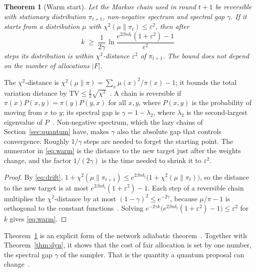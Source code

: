 \documentclass[11pt,a4paper]{article}
\newtheorem{theorem}{Theorem}
\newcommand{\TV}{\mathrm{TV}}
\begin{document}
\begin{theorem}[Warm start]\label{thm:warm}
Let the Markov chain used in round $t+1$ be reversible with stationary distribution $\pi_{t+1}$,
non-negative spectrum and spectral gap $\gamma$. If it starts from a distribution $\mu$ with $\chi^2(\mu\|\pi_t)\le\varepsilon^2$,
then after
\begin{equation}\label{eq:warm}
k\;\ge\;\frac1{2\gamma}\,\ln\frac{e^{2\beta n\delta_t}(1+\varepsilon^2)-1}{\varepsilon^2}
\end{equation}
steps its distribution is within $\chi^2$-distance $\varepsilon^2$ of $\pi_{t+1}$. The bound does not
depend on the number of allocations $|F|$.
\end{theorem}

The $\chi^2$-distance is $\chi^2(\mu\|\pi)=\sum_x\mu(x)^2/\pi(x)-1$; it bounds the total variation
distance by $\TV\le\frac12\sqrt{\chi^2}$~\cite{levin2017markov}. A chain is reversible if
$\pi(x)P(x,y)=\pi(y)P(y,x)$ for all $x,y$, where $P(x,y)$ is the probability of moving from $x$ to $y$;
its spectral gap is $\gamma=1-\lambda_2$, where $\lambda_2$ is the second-largest eigenvalue of
$P$~\cite{levin2017markov}. Non-negative spectrum, which the lazy chains of Section~\ref{sec:quantum}
have, makes $\gamma$ also the absolute gap that controls convergence. Roughly $1/\gamma$ steps are needed to forget the starting point. The
numerator in \eqref{eq:warm} is the distance to the new target just after the weights change, and
the factor $1/(2\gamma)$ is the time needed to shrink it to $\varepsilon^2$.

\begin{proof}
By \eqref{eq:drift}, $1+\chi^2(\mu\|\pi_{t+1})\le e^{2\beta n\delta_t}\bigl(1+\chi^2(\mu\|\pi_t)\bigr)$,
so the distance to the new target is at most $e^{2\beta n\delta_t}(1+\varepsilon^2)-1$. Each step of a
reversible chain multiplies the $\chi^2$-distance by at most $(1-\gamma)^2\le e^{-2\gamma}$, because
$\mu/\pi-1$ is orthogonal to the constant functions~\cite{levin2017markov}. Solving
$e^{-2\gamma k}\bigl(e^{2\beta n\delta_t}(1+\varepsilon^2)-1\bigr)\le\varepsilon^2$ for $k$ gives
\eqref{eq:warm}.
\end{proof}

Theorem~\ref{thm:warm} is an explicit form of the network adiabatic
theorem~\cite{rajagopalan2009network}. Together with Theorem~\ref{thm:dyn}, it shows that the cost of
fair allocation is set by one number, the spectral gap $\gamma$ of the sampler. That is the quantity a
quantum proposal can change~\cite{layden2023quantum}.
\end{document}
